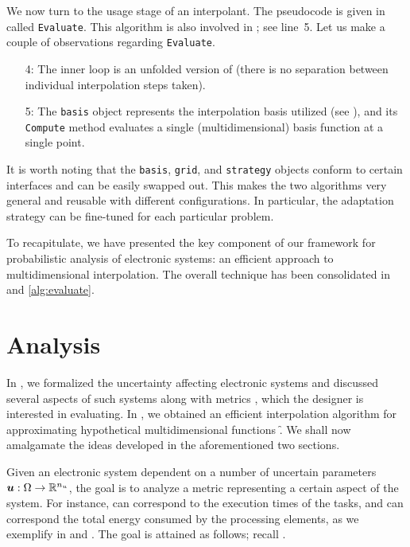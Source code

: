 We now turn to the usage stage of an interpolant. The pseudocode is given in
 called \texttt{Evaluate}. This algorithm is also involved in
; see line~5. Let us make a couple of observations regarding
\texttt{Evaluate}.

\begin{itemize}

\item[4:] The inner loop is an unfolded version of  (there
is no separation between individual interpolation steps taken).

\item[5:] The \texttt{basis} object represents the interpolation basis utilized
(see ), and its \texttt{Compute} method evaluates a single
(multidimensional) basis function at a single point.

\end{itemize}

It is worth noting that the \texttt{basis}, \texttt{grid}, and \texttt{strategy}
objects conform to certain interfaces and can be easily swapped out. This makes
the two algorithms very general and reusable with different configurations. In
particular, the adaptation strategy can be fine-tuned for each particular
problem.

To recapitulate, we have presented the key component of our framework for
probabilistic analysis of electronic systems: an efficient approach to
multidimensional interpolation. The overall technique has been consolidated in
 and \ref{alg:evaluate}.

\section{Analysis}

In , we formalized the uncertainty affecting electronic systems
and discussed several aspects of such systems along with metrics \g, which the
designer is interested in evaluating. In , we obtained an
efficient interpolation algorithm for approximating hypothetical
multidimensional functions \f. We shall now amalgamate the ideas developed in
the aforementioned two sections.

Given an electronic system dependent on a number of uncertain parameters $\boldsymbol{u}:
\Omega \to \mathbb{R}^{n_{u}}$, the goal is to analyze a metric \g representing a certain
aspect of the system. For instance, \vu can correspond to the execution times of
the tasks, and \g can correspond the total energy consumed by the processing
elements, as we exemplify in  and . The goal is attained
as follows; recall .

